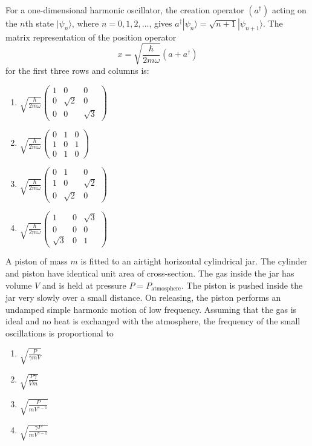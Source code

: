     \item For a one-dimensional harmonic oscillator, the creation operator $(a^{\dagger})$ acting on the $n$th state $|\psi_n\rangle$, where $n = 0, 1, 2, \ldots$, gives $a^{\dagger} |\psi_n\rangle = \sqrt{n + 1} |\psi_{n+1}\rangle$. The matrix representation of the position operator 
    \[
    x = \sqrt{\frac{\hbar}{2m\omega}} (a + a^{\dagger})
    \] 
    for the first three rows and columns is:
    \begin{enumerate}
        \item $\sqrt{\frac{\hbar}{2m\omega}} \begin{pmatrix}
        1 & 0 & 0 \\
        0 & \sqrt{2} & 0 \\
        0 & 0 & \sqrt{3}
        \end{pmatrix}$

        \item $\sqrt{\frac{\hbar}{2m\omega}} \begin{pmatrix}
        0 & 1 & 0 \\
        1 & 0 & 1 \\
        0 & 1 & 0
        \end{pmatrix}$

        \item $\sqrt{\frac{\hbar}{2m\omega}} \begin{pmatrix}
        0 & 1 & 0 \\
        1 & 0 & \sqrt{2} \\
        0 & \sqrt{2} & 0
        \end{pmatrix}$

        \item $\sqrt{\frac{\hbar}{2m\omega}} \begin{pmatrix}
        1 & 0 & \sqrt{3} \\
        0 & 0 & 0 \\
        \sqrt{3} & 0 & 1
        \end{pmatrix}$
    \end{enumerate}

    \item A piston of mass $ m $ is fitted to an airtight horizontal cylindrical jar. The cylinder and piston have identical unit area of cross-section. The gas inside the jar has volume $ V $ and is held at pressure $ P = P_{\text{atmosphere}} $. The piston is pushed inside the jar very slowly over a small distance. On releasing, the piston performs an undamped simple harmonic motion of low frequency. Assuming that the gas is ideal and no heat is exchanged with the atmosphere, the frequency of the small oscillations is proportional to
    \begin{enumerate}
        \item $ \sqrt{\frac{P}{\gamma m V}} $
        \item $ \sqrt{\frac{P \gamma}{V m}} $
        \item $ \sqrt{\frac{P}{m V^{\gamma - 1}}} $
        \item $ \sqrt{\frac{\gamma P}{m V^{\gamma - 1}}} $
    \end{enumerate}


